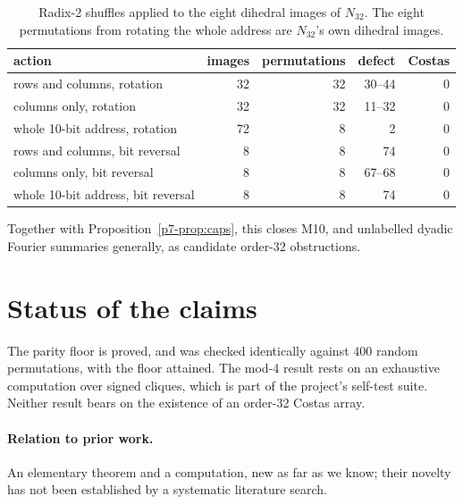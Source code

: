 \documentclass[11pt,a4paper,oneside]{report}
\theoremstyle{definition}
\begin{document}
\begin{table}[H]
\centering
\small
\begin{tabular}{@{}lrrrr@{}}
\toprule
action & images & permutations & defect & Costas \\
\midrule
rows and columns, rotation & 32 & 32 & 30--44 & 0 \\
columns only, rotation & 32 & 32 & 11--32 & 0 \\
whole 10-bit address, rotation & 72 & 8 & 2 & 0 \\
rows and columns, bit reversal & 8 & 8 & 74 & 0 \\
columns only, bit reversal & 8 & 8 & 67--68 & 0 \\
whole 10-bit address, bit reversal & 8 & 8 & 74 & 0 \\
\bottomrule
\end{tabular}
\caption{Radix-2 shuffles applied to the eight dihedral images of $N_{32}$. The eight permutations from
rotating the whole address are $N_{32}$'s own dihedral images.}
\label{p7-tab:shuffle}
\end{table}

\noindent Together with Proposition~\ref{p7-prop:caps}, this closes M10, and unlabelled dyadic Fourier
summaries generally, as candidate order-32 obstructions.

\section{Status of the claims}\label{p7-sec:status}
The parity floor is proved, and was checked identically against 400 random permutations, with
the floor attained. The mod-4 result rests on an exhaustive computation over signed cliques, which is
part of the project's self-test suite. Neither result bears on the existence of an order-32 Costas
array.

\paragraph{Relation to prior work.} An elementary theorem and a computation, new as far as we know; their novelty has not been established by a systematic literature search.
\end{document}
